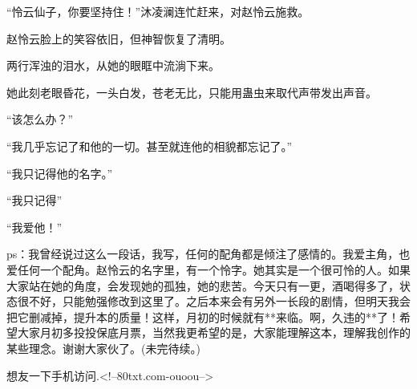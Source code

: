 \begin{this_body}
“怜云仙子，你要坚持住！”沐凌澜连忙赶来，对赵怜云施救。

赵怜云脸上的笑容依旧，但神智恢复了清明。

两行浑浊的泪水，从她的眼眶中流淌下来。

她此刻老眼昏花，一头白发，苍老无比，只能用蛊虫来取代声带发出声音。

“该怎么办？”

“我几乎忘记了和他的一切。甚至就连他的相貌都忘记了。”

“我只记得他的名字。”

“我只记得”

“我爱他！”

ps：我曾经说过这么一段话，我写，任何的配角都是倾注了感情的。我爱主角，也爱任何一个配角。赵怜云的名字里，有一个怜字。她其实是一个很可怜的人。如果大家站在她的角度，会发现她的孤独，她的悲苦。今天只有一更，酒喝得多了，状态很不好，只能勉强修改到这里了。之后本来会有另外一长段的剧情，但明天我会把它删减掉，提升本的质量！这样，月初的时候就有**来临。啊，久违的**了！希望大家月初多投投保底月票，当然我更希望的是，大家能理解这本，理解我创作的某些理念。谢谢大家伙了。(未完待续。)

想友一下手机访问.<!--80txt.com-ouoou-->

\end{this_body}

